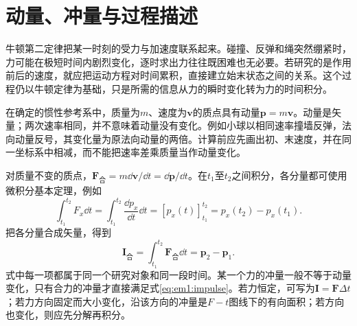 \section{动量、冲量与过程描述}

牛顿第二定律把某一时刻的受力与加速度联系起来。碰撞、反弹和绳突然绷紧时，力可能在极短时间内剧烈变化，逐时求出力往往既困难也无必要。若研究的是作用前后的速度，就应把运动方程对时间累积，直接建立始末状态之间的关系。这个过程仍以牛顿定律为基础，只是所需的信息从力的瞬时变化转为力的时间积分。

在确定的惯性参考系中，质量为$m$、速度为$\bm v$的质点具有动量$\bm p=m\bm v$。动量是矢量；两次速率相同，并不意味着动量没有变化。例如小球以相同速率撞墙反弹，法向动量反号，其变化量为原法向动量的两倍。计算前应先画出初、末速度，并在同一坐标系中相减，而不能把速率差乘质量当作动量变化。

对质量不变的质点，$\bm F_{\text{合}}=m\dd\bm v/\dd t=\dd\bm p/\dd t$。在$t_1$至$t_2$之间积分，各分量都可使用微积分基本定理，例如
\[
\int_{t_1}^{t_2}F_x\dd t
=\int_{t_1}^{t_2}\frac{\dd p_x}{\dd t}\dd t
=[p_x(t)]_{t_1}^{t_2}=p_x(t_2)-p_x(t_1).
\]
把各分量合成矢量，得到
\begin{equation}\bm I_{\text{合}}=\int_{t_1}^{t_2}\bm F_{\text{合}}\dd t=\bm p_2-\bm p_1.\label{eq:em1:impulse}\end{equation}
式中每一项都属于同一个研究对象和同一段时间。某一个力的冲量一般不等于动量变化，只有合力的冲量才直接满足式\eqref{eq:em1:impulse}。若力恒定，可写为$\bm I=\bm F\Delta t$；若力方向固定而大小变化，沿该方向的冲量是$F-t$图线下的有向面积；若方向也变化，则应先分解再积分。


